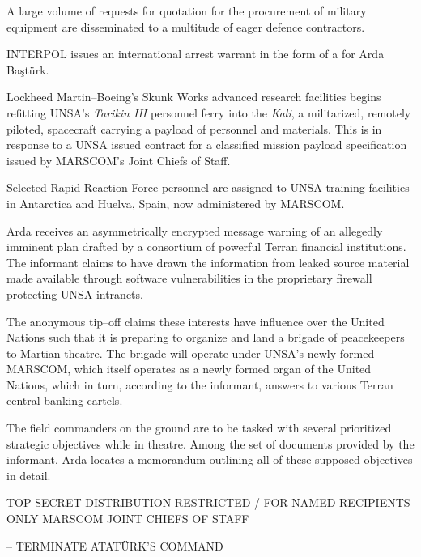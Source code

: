 A large volume of requests for quotation for the procurement of military equipment are disseminated to a multitude of eager defence contractors.
\StopTimelineDate

INTERPOL issues an international arrest warrant in the form of a  for Arda Baştürk.
\StopTimelineDate

Lockheed Martin--Boeing's Skunk Works advanced research facilities begins refitting UNSA's {\it Tarikin III} personnel ferry into the {\it Kali}, a militarized, remotely piloted, spacecraft carrying a payload of personnel and materials. This is in response to a UNSA issued contract for a classified mission payload specification issued by MARSCOM's Joint Chiefs of Staff.
\StopTimelineDate

Selected Rapid Reaction Force personnel are assigned to UNSA training facilities in Antarctica and Huelva, Spain, now administered by MARSCOM.
\StopTimelineDate

Arda receives an asymmetrically encrypted message warning of an allegedly imminent plan drafted by a consortium of powerful Terran financial institutions. The informant claims to have drawn the information from leaked source material made available through software vulnerabilities in the proprietary firewall protecting UNSA intranets. 

The anonymous tip--off claims these interests have influence over the United Nations such that it is preparing to organize and land a brigade of peacekeepers to Martian theatre. The brigade will operate under UNSA's newly formed MARSCOM, which itself operates as a newly formed organ of the United Nations, which in turn, according to the informant, answers to various Terran central banking cartels.

The field commanders on the ground are to be tasked with several prioritized strategic objectives while in theatre. Among the set of documents provided by the informant, Arda locates a memorandum outlining all of these supposed objectives in detail.

\startTimelineCorrespondenceDocument
TOP SECRET
DISTRIBUTION RESTRICTED / FOR NAMED RECIPIENTS ONLY
MARSCOM JOINT CHIEFS OF STAFF
\startitemize[4]
\item {} -- TERMINATE ATATÜRK'S COMMAND

